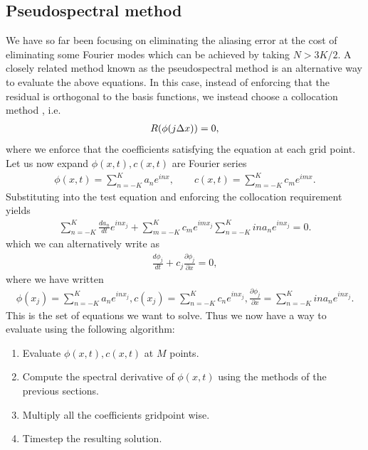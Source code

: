 \subsection{Pseudospectral method}
We have so far been focusing on eliminating the aliasing error at the cost of eliminating some Fourier modes which can be achieved by taking $N>3K/2$. A closely related method known as the pseudospectral method is an alternative way to evaluate the above equations. In this case, instead of enforcing that the residual is orthogonal to the basis functions, we instead choose a collocation method \cite{durran}, i.e.
\begin{align}
R(\phi(j\Delta x)) = 0,
\end{align}
where we enforce that the coefficients satisfying the equation at each grid point.  Let us now expand $\phi(x,t),c(x,t)$ are Fourier series
\begin{align}
\phi(x,t) = \sum_{n=-K}^{K}a_{n}e^{inx}, \qquad c(x,t) = \sum_{m=-K}^{K}c_{m}e^{imx}.
\end{align}
Substituting into the test equation and enforcing the collocation requirement yields
\begin{align}
\sum_{n=-K}^{K}\frac{da_{n}}{dt}e^{inx_{j}} + \sum_{m=-K}^{K}c_{m}e^{imx_{j}}\sum_{n=-K}^{K}ina_{n}e^{inx_{j}}=0.
\end{align} 
which we can alternatively write as
\begin{align}
\frac{d\phi_{j}}{dt} + c_{j}\frac{\partial \phi_{j}}{\partial x} = 0,
\end{align}
where we have written
\begin{align}
\phi(x_{j}) = \sum_{n=-K}^{K}a_{n}e^{inx_{j}}, c(x_{j}) = \sum_{n=-K}^{K}c_{n}e^{inx_{j}}, \frac{\partial\phi_{j}}{\partial x} = \sum_{n=-K}^{K}ina_{n}e^{inx_{j}}.
\end{align}
This is the set of equations we want to solve. Thus we now have a way to evaluate using the following algorithm:
\begin{enumerate}
\item Evaluate $\phi(x,t),c(x,t)$ at $M$ points.
\item Compute the spectral derivative of $\phi(x,t)$ using the methods of the previous sections.
\item Multiply all the coefficients gridpoint wise.
\item Timestep the resulting solution.
\end{enumerate} 

